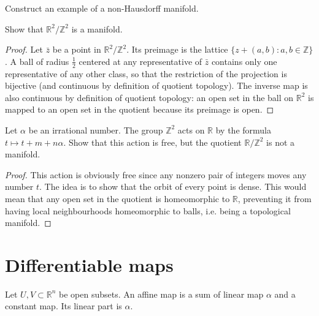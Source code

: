 \begin{exercise}
\label{exercise-nonhausdorff-manifold}
Construct an example of a non-Hausdorff
manifold.
\end{exercise}

\begin{exercise}
\label{exercise-r2-quotient-z2-manifold}
Show that $\mathbb{R}^2/\mathbb{Z}^2$ is a
manifold.
\end{exercise}

\begin{proof}
Let $\bar{z}$ be a point in
$\mathbb{R}^2/\mathbb{Z}^2$. Its preimage is
the lattice $\{z+(a,b):a,b \in \mathbb{Z}\}$.
A ball of radius $\frac{1}{2}$ centered at
any representative of $\bar{z}$ contains
only one representative of any other class,
so that the restriction of the projection is
bijective (and continuous by definition of
quotient topology). The inverse map is also
continuous by definition of quotient
topology: an open set in the ball on
$\mathbb{R}^2$ is mapped to an open set in
the quotient because its preimage is open.
\end{proof}

\begin{exercise}
\label{exercise-irrational-action-not-manifold}
Let $\alpha$ be an irrational number. The
group $\mathbb{Z}^2$ acts on $\mathbb{R}$ by
the formula $t \mapsto t + m + n\alpha$.
Show that this action is free, but the
quotient $\mathbb{R}/\mathbb{Z}^2$ is not a
manifold.
\end{exercise}

\begin{proof}
This action is obviously free since any
nonzero pair of integers moves any number
$t$. The idea is to show that the orbit of
every point is dense. This would mean that
any open set in the quotient is homeomorphic
to $\mathbb{R}$, preventing it from having
local neighbourhoods homeomorphic to balls,
i.e. being a topological manifold.
\end{proof}

\section{Differentiable maps}
\label{section-differentiable-maps}

\begin{definition}
\label{definition-affine-map}
Let $U, V \subset \mathbb{R}^n$ be open
subsets. An affine map is a sum of linear
map $\alpha$ and a constant map. Its linear
part is $\alpha$.
\end{definition}

